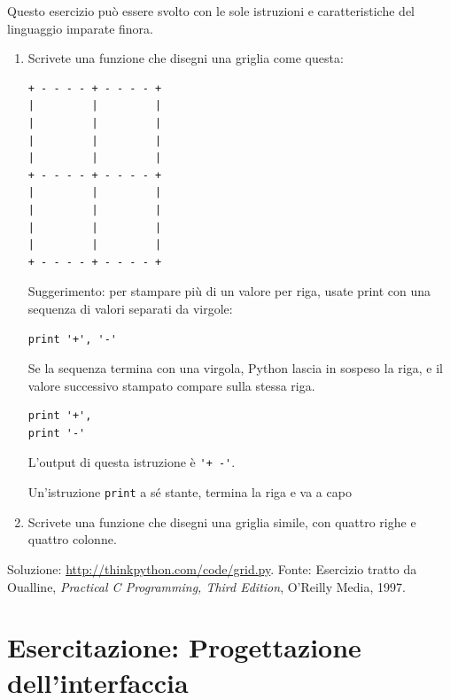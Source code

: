 \documentclass[10pt]{book}
\begin{document}
\vspace{0.2in}
\begin{exercise}

Questo esercizio può essere svolto con le sole istruzioni e caratteristiche del linguaggio imparate finora.

\begin{enumerate}

\item Scrivete una funzione che disegni una griglia come questa:

\begin{verbatim}
+ - - - - + - - - - +
|         |         |
|         |         |
|         |         |
|         |         |
+ - - - - + - - - - +
|         |         |
|         |         |
|         |         |
|         |         |
+ - - - - + - - - - +
\end{verbatim}
%
Suggerimento: per stampare più di un valore per riga, usate print con una sequenza di valori separati da virgole:

\begin{verbatim}
print '+', '-'
\end{verbatim}
%
Se la sequenza termina con una virgola, Python lascia in sospeso la riga, e il valore successivo stampato compare sulla stessa riga.

\begin{verbatim}
print '+', 
print '-'
\end{verbatim}
%
L'output di questa istruzione è \verb"'+ -'".

Un'istruzione {\tt print} a sé stante, termina la riga e va a capo

\item Scrivete una funzione che disegni una griglia simile, con quattro righe e quattro colonne.

\end{enumerate}

Soluzione: \url{http://thinkpython.com/code/grid.py}.
Fonte: Esercizio tratto da Oualline, {\em Practical C Programming, Third Edition}, O'Reilly Media, 1997.

\end{exercise}





\chapter{Esercitazione: Progettazione dell'interfaccia}
\label{turtlechap}
\end{document}
